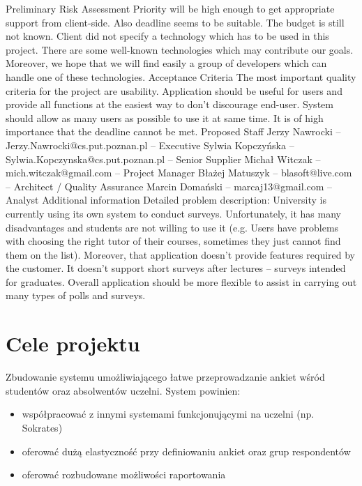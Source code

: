 Preliminary Risk Assessment
Priority will be high enough to get appropriate support from client-side. Also deadline seems to be suitable. The budget is still not known. Client did not specify a technology which has to be used in this project. There are some well-known technologies which may contribute our goals. Moreover, we hope that we will find easily a group of developers which can handle one of these technologies.
Acceptance Criteria
The most important quality criteria for the project are usability. Application should be useful for users and provide all functions at the easiest way to don't discourage end-user. System should allow as many users as possible to use it at same time. It is of high importance that the deadline cannot be met.
Proposed Staff
Jerzy Nawrocki – Jerzy.Nawrocki@cs.put.poznan.pl – Executive
Sylwia Kopczyńska – Sylwia.Kopczynska@cs.put.poznan.pl – Senior Supplier
Michał Witczak – mich.witczak@gmail.com  – Project Manager
Błażej Matuszyk – blasoft@live.com – Architect / Quality Assurance
Marcin Domański – marcaj13@gmail.com – Analyst
Additional information
Detailed problem description:
University is currently using its own system to conduct surveys. Unfortunately, it has many disadvantages and students are not willing to use it (e.g. Users have problems with choosing the right tutor of their courses, sometimes they just cannot find them on the list). Moreover, that application doesn’t provide features required by the customer. It doesn’t support short surveys after lectures – surveys intended for graduates. Overall application should be more flexible to assist in carrying out many types of polls and surveys.

\section{Cele projektu}
Zbudowanie systemu umożliwiającego łatwe przeprowadzanie ankiet wśród studentów oraz absolwentów uczelni. System powinien:
\begin{itemize}
\item{współpracować z innymi systemami funkcjonującymi na uczelni (np. Sokrates)}
\item{oferować dużą elastyczność przy definiowaniu ankiet oraz grup respondentów}
\item{oferować rozbudowane możliwości raportowania}
\end{itemize}



